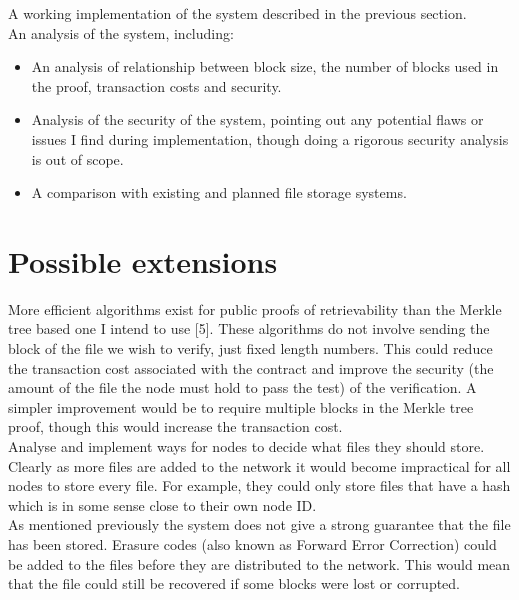 \documentclass[oneside]{article}
\begin{document}
A working implementation of the system described in the previous section.\\

An analysis of the system, including:
\begin{itemize}
\item An analysis of relationship between block size, the number of blocks used in the proof, transaction costs and security.
\item Analysis of the security of the system, pointing out any potential flaws or issues I find during implementation, though doing a rigorous security analysis is out of scope.
\item A comparison with existing and planned file storage systems.
\end{itemize}






\section{Possible extensions}

More efficient algorithms exist for public proofs of retrievability than the Merkle tree based one I intend to use [5].
These algorithms do not involve sending the block of the file we wish to verify, just fixed length numbers.
This could reduce the transaction cost associated with the contract and improve the security (the amount of the file the node must hold to pass the test) of the verification.
A simpler improvement would be to require multiple blocks in the Merkle tree proof, though this would increase the transaction cost.\\

Analyse and implement ways for nodes to decide what files they should store.
Clearly as more files are added to the network it would become impractical for all nodes to store every file.
For example, they could only store files that have a hash which is in some sense close to their own node ID.\\

As mentioned previously the system does not give a strong guarantee that the file has been stored.
Erasure codes (also known as Forward Error Correction) could be added to the files before they are distributed to the network.
This would mean that the file could still be recovered if some blocks were lost or corrupted.\\
\end{document}
